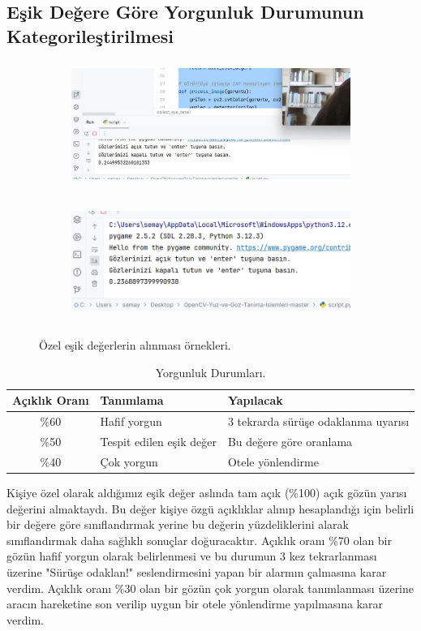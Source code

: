 \documentclass[12pt, a4paper]{article}
\begin{document}
    \subsection{ Eşik Değere Göre Yorgunluk Durumunun Kategorileştirilmesi} 
	
	\begin{figure}[htbp][!]
		\centering
		\begin{subfigure}{.5\textwidth}
			\centering
			\includegraphics[width=\linewidth,height=4cm]{ goz_esik1.jpg}
			\caption{}
			\label{fig:sub1}
		\end{subfigure}%
		\begin{subfigure}{.5\textwidth}
			\centering
			\includegraphics[width=\linewidth,height=4cm]{goz_esik2.jpg}
			\caption{}
			\label{fig:sub2}
		\end{subfigure}
		\caption{Özel eşik değerlerin alınması örnekleri.}
		\label{fig:test}
	\end{figure} \newpage
	\begin{table}[h!]
		\begin{center}
			\caption{Yorgunluk Durumları.}
			\label{tab:table1}
			\begin{tabular}{c|l|l|}
				\textbf{Açıklık Oranı} & \textbf{Tanımlama} & \textbf{Yapılacak}\\
				\hline
				\%60 & Hafif yorgun & 3 tekrarda sürüşe odaklanma uyarısı\\
				\%50 & Tespit edilen eşik değer & Bu değere göre oranlama\\
				\%40 & Çok yorgun & Otele yönlendirme\\
			\end{tabular}
		\end{center}
	\end{table}
	Kişiye özel olarak aldığımız eşik değer aslında tam açık (\%100) açık gözün yarısı değerini almaktaydı. Bu değer kişiye özgü açıklıklar alınıp hesaplandığı için belirli bir değere göre sınıflandırmak yerine bu değerin yüzdeliklerini alarak sınıflandırmak daha sağlıklı sonuçlar doğuracaktır.
	Açıklık oranı \%70 olan bir gözün hafif yorgun olarak belirlenmesi ve bu durumun 3 kez tekrarlanması üzerine "Sürüşe odaklan!" seslendirmesini yapan bir alarmın çalmasına karar verdim. Açıklık oranı \%30 olan bir gözün çok yorgun olarak tanımlanması üzerine aracın hareketine son verilip uygun bir otele yönlendirme yapılmasına karar verdim.\newpage
\end{document}
